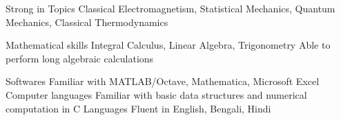 

\begin{cvskills}

  \cvskill
    {Strong in Topics} %
    {Classical Electromagnetism, Statistical Mechanics, Quantum Mechanics, Classical Thermodynamics} %

  
  \cvskill
	{Mathematical skills} %
	{Integral Calculus, Linear Algebra, Trigonometry}
  \cvskill
	{}
	{Able to perform long algebraic calculations} %

  \cvskill
    {Softwares} %
    {Familiar with MATLAB/Octave, Mathematica, Microsoft Excel} %
\cvskill
{Computer languages} %
{Familiar with basic data structures and numerical computation in C} %
  \cvskill
    {Languages} %
    {Fluent in English, Bengali, Hindi} %

\end{cvskills}
